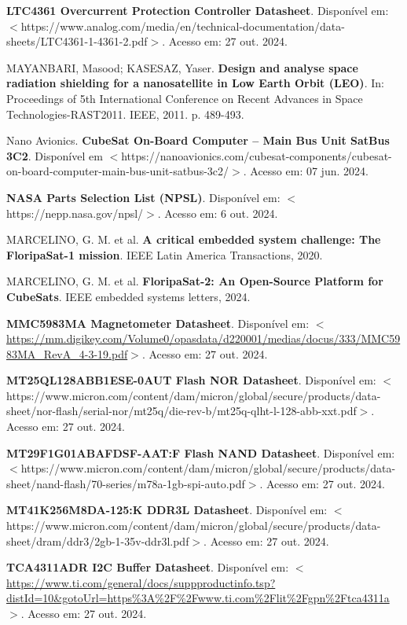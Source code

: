 \begin{flushleft}
\begin{thebibliography}{00}
 \textbf{LTC4361 Overcurrent Protection Controller Datasheet}. Disponível em: $<$https://www.analog.com/media/en/technical-documentation/data-sheets/LTC4361-1-4361-2.pdf$>$. Acesso em: 27 out. 2024. 

 MAYANBARI, Masood; KASESAZ, Yaser. \textbf{Design and analyse space radiation shielding for a nanosatellite in Low Earth Orbit (LEO)}. In: Proceedings of 5th International Conference on Recent Advances in Space Technologies-RAST2011. IEEE, 2011. p. 489-493.

 Nano Avionics. \textbf{CubeSat On-Board Computer – Main Bus Unit SatBus 3C2}. Disponível em $<$https://nanoavionics.com/cubesat-components/cubesat-on-board-computer-main-bus-unit-satbus-3c2/$>$. Acesso em: 07 jun. 2024.

 \textbf{NASA Parts Selection List (NPSL)}. Disponível em: $<$https://nepp.nasa.gov/npsl/$>$. Acesso em: 6 out. 2024.

 MARCELINO, G. M. et al. \textbf{A critical embedded system challenge: The FloripaSat-1 mission}. IEEE Latin America Transactions, 2020.

 MARCELINO, G. M. et al. \textbf{FloripaSat-2: An Open-Source Platform for CubeSats}. IEEE embedded systems letters, 2024.

 \textbf{MMC5983MA Magnetometer Datasheet}. Disponível em: $<$\url{https://mm.digikey.com/Volume0/opasdata/d220001/medias/docus/333/MMC5983MA\_RevA\_4-3-19.pdf}$>$. Acesso em: 27 out. 2024. 

 \textbf{MT25QL128ABB1ESE-0AUT Flash NOR Datasheet}. Disponível em: $<$https://www.micron.com/content/dam/micron/global/secure/products/data-sheet/nor-flash/serial-nor/mt25q/die-rev-b/mt25q-qlht-l-128-abb-xxt.pdf$>$. Acesso em: 27 out. 2024. 

 \textbf{MT29F1G01ABAFDSF-AAT:F Flash NAND Datasheet}. Disponível em: $<$https://www.micron.com/content/dam/micron/global/secure/products/data-sheet/nand-flash/70-series/m78a-1gb-spi-auto.pdf$>$. Acesso em: 27 out. 2024. 

 \textbf{MT41K256M8DA-125:K DDR3L Datasheet}. Disponível em: $<$https://www.micron.com/content/dam/micron/global/secure/products/data-sheet/dram/ddr3/2gb-1-35v-ddr3l.pdf$>$. Acesso em: 27 out. 2024. 

 \textbf{TCA4311ADR I2C Buffer Datasheet}. Disponível em: $<$\url{https://www.ti.com/general/docs/suppproductinfo.tsp?distId=10\&gotoUrl=https\%3A\%2F\%2Fwww.ti.com\%2Flit\%2Fgpn\%2Ftca4311a}$>$. Acesso em: 27 out. 2024. 


\end{thebibliography}
\end{flushleft}
